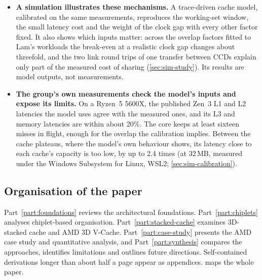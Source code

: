 \begin{itemize}
  \item \textbf{A simulation illustrates these mechanisms.} A trace-driven cache model, calibrated on the same measurements, reproduces the working-set window, the small latency cost and the weight of the clock gap with every other factor fixed. It also shows which inputs matter: across the overlap factors fitted to Lam's workloads the break-even at a realistic clock gap changes about threefold, and the two link round trips of one transfer between CCDs explain only part of the measured cost of sharing (\cref{sec:sim-study}). Its results are model outputs, not measurements.
  \item \textbf{The group's own measurements check the model's inputs and expose its limits.} On a Ryzen~5 5600X, the published Zen~3 L1 and L2 latencies the model uses agree with the measured ones, and its L3 and memory latencies are within about 20\%. The core keeps at least sixteen misses in flight, enough for the overlap the calibration implies. Between the cache plateaus, where the model's own behaviour shows, its latency close to each cache's capacity is too low, by up to 2.4 times (at 32\,MB, measured under the Windows Subsystem for Linux, WSL2; \cref{sec:sim-calibration}).
\end{itemize}

\subsection{Organisation of the paper}
\label{sec:organisation}

Part~\ref{part:foundations} reviews the architectural foundations. Part~\ref{part:chiplets} analyses chiplet-based organisation. Part~\ref{part:stacked-cache} examines 3D-stacked cache and AMD 3D V-Cache. Part~\ref{part:case-study} presents the AMD case study and quantitative analysis, and Part~\ref{part:synthesis} compares the approaches, identifies limitations and outlines future directions. Self-contained derivations longer than about half a page appear as appendices.  maps the whole paper.


